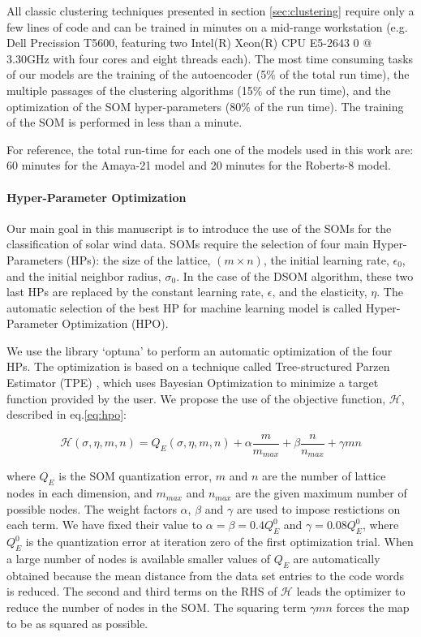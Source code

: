 \documentclass[utf8]{frontiersSCNS} %
\begin{document}
All classic clustering techniques presented in section \ref{sec:clustering} require only a few lines of code and can be trained in minutes on a mid-range workstation (e.g. Dell Precission T5600, featuring two Intel(R) Xeon(R) CPU E5-2643 0 @ 3.30GHz with four cores and eight threads each). The most time consuming tasks of our models are the training of the autoencoder (5\% of the total run time), the multiple passages of the clustering algorithms (15\% of the run time), and the optimization of the SOM hyper-parameters (80\% of the run time). The training of the SOM is performed in less than a minute.

For reference, the total run-time for each one of the models used in this work are: 60 minutes for the Amaya-21 model and 20 minutes for the Roberts-8 model.

\paragraph{Hyper-Parameter Optimization}
Our main goal in this manuscript is to introduce the use of the SOMs for the classification of solar wind data. SOMs require the selection of four main Hyper-Parameters (HPs): the size of the lattice, $(m\times n)$, the initial learning rate, $\epsilon_0$, and the initial neighbor radius, $\sigma_0$. In the case of the DSOM algorithm, these two last HPs are replaced by the constant learning rate, $\epsilon$, and the elasticity, $\eta$. The automatic selection of the best HP for machine learning model is called Hyper-Parameter Optimization (HPO).

We use the library `optuna' \citep{Akiba2019} to perform an automatic optimization of the four HPs. The optimization is based on a technique called Tree-structured Parzen Estimator (TPE) \citep{pmlr-v28-bergstra13}, which uses Bayesian Optimization to minimize a target function provided by the user. We propose the use of the objective function, $\mathcal{H}$, described in eq.\eqref{eq:hpo}:

\begin{equation}
\mathcal{H}\left(\sigma, \eta, m, n\right) = Q_E(\sigma, \eta, m, n) + \alpha \frac{m}{m_{max}} + \beta \frac{n}{n_{max}} + \gamma m n \label{eq:hpo}
\end{equation}

where $Q_E$ is the SOM quantization error, $m$ and $n$ are the number of lattice nodes in each dimension, and $m_{max}$ and $n_{max}$ are the given maximum number of possible nodes. The weight factors $\alpha$, $\beta$ and $\gamma$ are used to impose restictions on each term. We have fixed their value to $\alpha=\beta=0.4 Q_E^0$ and $\gamma=0.08Q_E^0$, where $Q_E^0$ is the quantization error at iteration zero of the first optimization trial. When a large number of nodes is available smaller values of $Q_E$ are automatically obtained because the mean distance from the data set entries to the code words is reduced. The second and third terms on the RHS of $\mathcal{H}$ leads the optimizer to reduce the number of nodes in the SOM. The squaring term $\gamma m n$ forces the map to be as squared as possible.
\end{document}
